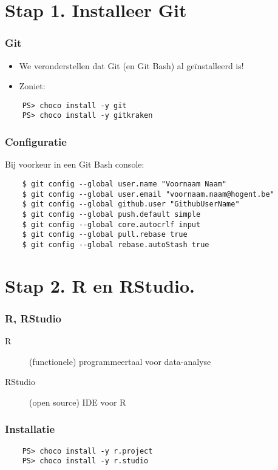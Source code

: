 \documentclass[aspectratio=169]{beamer}
\begin{document}
\section{Stap 1. Installeer Git}

\begin{frame}[fragile]
  \frametitle{Git}

  \begin{itemize}
    \item We veronderstellen dat Git (en Git Bash) al geïnstalleerd is!
    \item Zoniet:
  \end{itemize}

  \begin{verbatim}
    PS> choco install -y git
    PS> choco install -y gitkraken
  \end{verbatim}
\end{frame}

\begin{frame}[fragile]
  \frametitle{Configuratie}

  Bij voorkeur in een Git Bash console:

  \begin{verbatim}
    $ git config --global user.name "Voornaam Naam"
    $ git config --global user.email "voornaam.naam@hogent.be"
    $ git config --global github.user "GithubUserName"
    $ git config --global push.default simple
    $ git config --global core.autocrlf input
    $ git config --global pull.rebase true
    $ git config --global rebase.autoStash true
  \end{verbatim}

\end{frame}

\section{Stap 2. R en RStudio.}

\begin{frame}
  \frametitle{R, RStudio}

  \begin{description}
    \item[R] (functionele) programmeertaal voor data-analyse
    \item[RStudio] (open source) IDE voor R
  \end{description}

\end{frame}

\begin{frame}[fragile]
  \frametitle{Installatie}

  \begin{verbatim}
    PS> choco install -y r.project
    PS> choco install -y r.studio
  \end{verbatim}

\end{frame}
\end{document}
